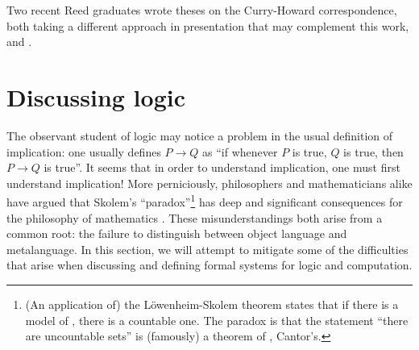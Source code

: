 \documentclass[12pt,twoside]{reedthesis}
\let\oldindex\index
\renewcommand{\index}[1]
               {\oldindex{#1}\marginpar{\footnotesize\color{index}index: #1}}
\newcommand{\define}[1]{\textbf{#1}} %
\newtheorem{notation}[theorem]{Notation}
\begin{document}
Two recent Reed graduates wrote theses on the Curry-Howard correspondence, both
taking a different approach in presentation that may complement this work,
\cite{curry-howard-reed-thesis} and \cite{process-calculi-reed-thesis}.


\section{Discussing logic}
\label{sec:discussing-logic}

The observant student of logic may notice a problem in the usual definition of
implication: one usually defines $P→ Q$ as ``if whenever $P$ is true,
$Q$ is true, then $P→ Q$ is true''. It seems that in order to understand
implication, one must first understand implication! More perniciously,
philosophers and mathematicians alike have argued that Skolem's
``paradox''\footnote{(An application of) the L\"owenheim-Skolem theorem states
  that if there is a model of \ZFC, there is a countable one.
  The paradox is that the statement ``there are uncountable sets'' is (famously)
  a theorem of \ZFC, Cantor's.}
has deep and significant consequences for the philosophy of
mathematics \cite{skolem}. These misunderstandings both arise from a common
root: the failure to distinguish between object language and metalanguage. In
this section, we will attempt to mitigate some of the difficulties that arise
when discussing and defining formal systems for logic and computation.

\end{document}
